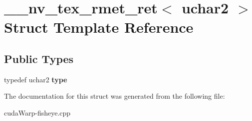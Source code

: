 \hypertarget{struct____nv__tex__rmet__ret_3_01uchar2_01_4}{}\section{\+\_\+\+\_\+nv\+\_\+tex\+\_\+rmet\+\_\+ret$<$ uchar2 $>$ Struct Template Reference}
\label{struct____nv__tex__rmet__ret_3_01uchar2_01_4}
\subsection*{Public Types}
\begin{DoxyCompactItemize}
\item 
typedef uchar2 {\bfseries type}\hypertarget{struct____nv__tex__rmet__ret_3_01uchar2_01_4_a50aaf1dd3fc482875551cdfa53b37757}{}\label{struct____nv__tex__rmet__ret_3_01uchar2_01_4_a50aaf1dd3fc482875551cdfa53b37757}

\end{DoxyCompactItemize}


The documentation for this struct was generated from the following file\+:\begin{DoxyCompactItemize}
\item 
cuda\+Warp-\/fisheye.\+cpp\end{DoxyCompactItemize}
